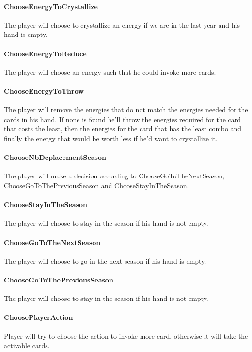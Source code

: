 \begin{appendices}
\paragraph{ChooseEnergyToCrystallize}
The player will choose to crystallize an energy if we are in the last year and his hand is empty.

\paragraph{ChooseEnergyToReduce}
The player will choose an energy such that he could invoke more cards.

\paragraph{ChooseEnergyToThrow}
The player will remove the energies that do not match the energies needed for the cards in his hand. If none is found he'll throw the energies required for the card that costs the least, then the energies for the card that has the least combo and finally the energy that would be worth less if he'd want to crystallize it.

\paragraph{ChooseNbDeplacementSeason}
The player will make a decision according to ChooseGoToTheNextSeason, ChooseGoToThePreviousSeason and ChooseStayInTheSeason.

\paragraph{ChooseStayInTheSeason}
The player will choose to stay in the season if his hand is not empty.

\paragraph{ChooseGoToTheNextSeason}
The player will choose to go in the next season if his hand is empty.

\paragraph{ChooseGoToThePreviousSeason}
The player will choose to stay in the season if his hand is not empty.

\paragraph{ChoosePlayerAction}
Player will try to choose the action to invoke more card, otherwise it will take the activable cards.


\end{appendices}
